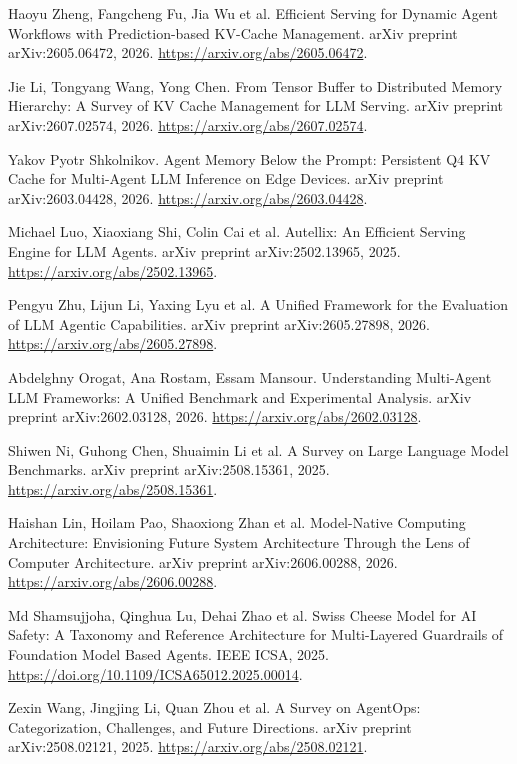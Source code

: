  Haoyu Zheng, Fangcheng Fu, Jia Wu et al. Efficient Serving for Dynamic Agent Workflows with Prediction-based {KV}-Cache Management. arXiv preprint arXiv:2605.06472, 2026. \url{https://arxiv.org/abs/2605.06472}.

 Jie Li, Tongyang Wang, Yong Chen. From Tensor Buffer to Distributed Memory Hierarchy: A Survey of {KV} Cache Management for {LLM} Serving. arXiv preprint arXiv:2607.02574, 2026. \url{https://arxiv.org/abs/2607.02574}.

 Yakov Pyotr Shkolnikov. Agent Memory Below the Prompt: Persistent {Q4} {KV} Cache for Multi-Agent {LLM} Inference on Edge Devices. arXiv preprint arXiv:2603.04428, 2026. \url{https://arxiv.org/abs/2603.04428}.

 Michael Luo, Xiaoxiang Shi, Colin Cai et al. {Autellix}: An Efficient Serving Engine for {LLM} Agents. arXiv preprint arXiv:2502.13965, 2025. \url{https://arxiv.org/abs/2502.13965}.

 Pengyu Zhu, Lijun Li, Yaxing Lyu et al. A Unified Framework for the Evaluation of {LLM} Agentic Capabilities. arXiv preprint arXiv:2605.27898, 2026. \url{https://arxiv.org/abs/2605.27898}.

 Abdelghny Orogat, Ana Rostam, Essam Mansour. Understanding Multi-Agent {LLM} Frameworks: A Unified Benchmark and Experimental Analysis. arXiv preprint arXiv:2602.03128, 2026. \url{https://arxiv.org/abs/2602.03128}.

 Shiwen Ni, Guhong Chen, Shuaimin Li et al. A Survey on Large Language Model Benchmarks. arXiv preprint arXiv:2508.15361, 2025. \url{https://arxiv.org/abs/2508.15361}.

 Haishan Lin, Hoilam Pao, Shaoxiong Zhan et al. Model-Native Computing Architecture: Envisioning Future System Architecture Through the Lens of Computer Architecture. arXiv preprint arXiv:2606.00288, 2026. \url{https://arxiv.org/abs/2606.00288}.

 Md Shamsujjoha, Qinghua Lu, Dehai Zhao et al. Swiss Cheese Model for {AI} Safety: A Taxonomy and Reference Architecture for Multi-Layered Guardrails of Foundation Model Based Agents. IEEE ICSA, 2025. \url{https://doi.org/10.1109/ICSA65012.2025.00014}.

 Zexin Wang, Jingjing Li, Quan Zhou et al. A Survey on {AgentOps}: Categorization, Challenges, and Future Directions. arXiv preprint arXiv:2508.02121, 2025. \url{https://arxiv.org/abs/2508.02121}.

